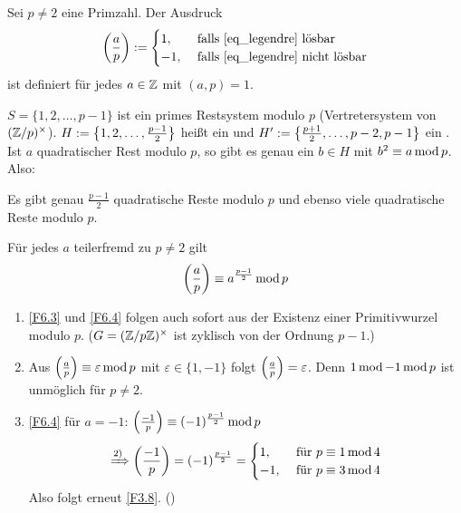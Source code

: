 \begin{defn}[Legendresymbol]
	Sei $p \neq 2$ eine Primzahl. Der Ausdruck
	\begin{equation}
		\leg{a}{p} := \begin{cases}
			1, & \text{ falls \eqref{eq_legendre} lösbar} \\
			-1, & \text{ falls \eqref{eq_legendre} nicht lösbar} \\
		\end{cases}
	\end{equation}
	ist definiert für jedes $a \in \ZZ$ mit $(a,p) = 1$. 
\end{defn}

$S = \{ 1,2,\dots,p-1\}$ ist ein primes Restsystem modulo $p$ (Vertretersystem von $(\ZZ/p)^\times$). $H := \penbrace*{1, 2, \dots, \frac{p-1}{2}}$ heißt ein  und $H' := \penbrace*{ \frac{p+1}{2}, \dots, p-2, p-1 }$ ein . Ist $a$ quadratischer Rest modulo $p$, so gibt es genau ein $b \in H$ mit $b^2 \kon a \modu p$. Also:

\begin{falko} \label{F6.3}
	Es gibt genau $\frac{p-1}{2}$ quadratische Reste modulo $p$ und ebenso viele quadratische Reste modulo $p$.
\end{falko}

\begin{falko} \label{F6.4}
	Für jedes $a$ teilerfremd zu $p \neq 2$ gilt
	\[ \leg{a}{p} \kon a^{\frac{p-1}{2}} \modu p \]
\end{falko}

	\begin{enumerate}[1)]
		\item \ref{F6.3} und \ref{F6.4} folgen auch sofort aus der Existenz einer Primitivwurzel modulo $p$. ($G = (\ZZ/p\ZZ)^\times$ ist zyklisch von der Ordnung $p-1$.)
		\item Aus $\leg{a}{p} \kon \varepsilon \modu p$ mit $\varepsilon \in \{1,-1\}$ folgt $\leg{a}{p} = \varepsilon$. Denn $1 \modu -1 \modu p$ ist unmöglich für $p \neq 2$.
		\item \ref{F6.4} für $a = -1$: $\leg{-1}{p} \kon (-1)^\frac{p-1}{2} \modu p$
		\begin{equation}
			\xRightarrow{\text{2)}} \leg{-1}{p} = (-1)^\frac{p-1}{2} = \begin{cases}
				1, & \text{ für } p \kon 1 \modu 4 \\
				-1, & \text{ für } p \kon 3 \modu 4
			\end{cases} \label{eq_F6.4}
		\end{equation}
		Also folgt erneut \ref{F3.8}. ()
	\end{enumerate}
	
